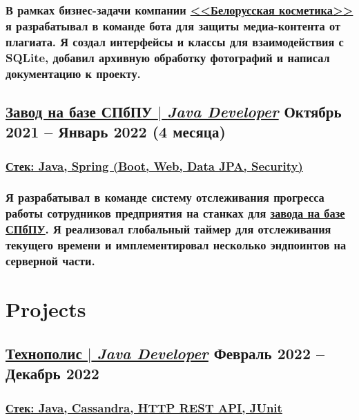\documentclass[11pt]{article}
\begin{document}
\subsubsection{В рамках бизнес-задачи компании \href{https://www.wbc-c.ru/}{\underline{<<Белорусская косметика>>}} я разрабатывал в команде бота для защиты медиа-контента от плагиата. Я создал \textbf{интерфейсы и классы для взаимодействия с SQLite}, добавил \textbf{архивную обработку фотографий} и написал документацию к проекту.}
\begin{itemize}
\end{itemize}

\subsection{\href{https://github.com/martyn-fanclub/tracking-system}{\underline{Завод на базе СПбПУ $|$ {\normalfont\textit{Java Developer}}}} \hfill Октябрь 2021 -- Январь 2022 (4 месяца)}
\subsubsection{\underline{\textbf{Стек}: Java, Spring (Boot, Web, Data JPA, Security)}}
\subsubsection{Я разрабатывал в команде \textbf{систему отслеживания прогресса работы сотрудников предприятия на станках} для \href{https://www.spbstu.ru/}{\underline{завода на базе СПбПУ}}. Я реализовал \textbf{глобальный таймер} для отслеживания текущего времени и имплементировал несколько \textbf{эндпоинтов} на серверной части.}
\begin{itemize}
\end{itemize}

\section{Projects}
\subsection{\href{https://github.com/polis-vk/2022-highload-dht/tree/main/src/main/java/ok/dht/test/kovalenko}{\underline{Технополис $|$ {\normalfont\textit{Java Developer}}}} \hfill Февраль 2022 -- Декабрь 2022}
\subsubsection{\underline{\textbf{Стек}: Java, Cassandra, HTTP REST API, JUnit}}
\end{document}
